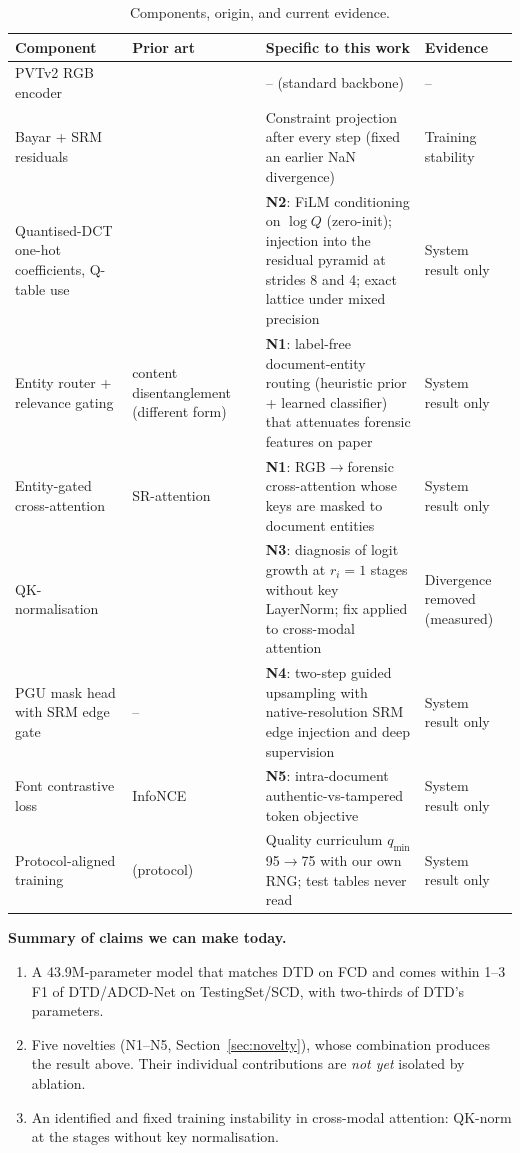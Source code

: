 \documentclass[10pt,a4paper]{article}
\begin{document}
\begin{table}[!htbp]
\centering
\caption{Components, origin, and current evidence.}
\label{tab:novelty}
\small
\begin{tabularx}{\textwidth}{@{}>{\raggedright\arraybackslash}p{3.3cm}>{\raggedright\arraybackslash}p{3.0cm}>{\raggedright\arraybackslash}X>{\raggedright\arraybackslash}p{2.7cm}@{}}
\toprule
Component & Prior art & Specific to this work & Evidence \\
\midrule
PVTv2 RGB encoder & \cite{pvtv2} & -- (standard backbone) & -- \\
Bayar + SRM residuals & \cite{bayar,srm} & Constraint projection after every step (fixed an
  earlier NaN divergence) & Training stability \\
Quantised-DCT one-hot coefficients, Q-table use & \cite{catnet,dtd} & \textbf{N2}: FiLM
  conditioning on $\log Q$ (zero-init); injection into the residual pyramid at strides 8
  and 4; exact lattice under mixed precision & System result only \\
Entity router + relevance gating & content disentanglement~\cite{adcd} (different form) &
  \textbf{N1}: label-free document-entity routing (heuristic prior + learned classifier)
  that attenuates forensic features on paper & System result only \\
Entity-gated cross-attention & SR-attention~\cite{pvtv2} & \textbf{N1}: RGB$\rightarrow$forensic
  cross-attention whose keys are masked to document entities & System result only \\
QK-normalisation & \cite{qknorm} & \textbf{N3}: diagnosis of logit growth at $r_i=1$ stages
  without key LayerNorm; fix applied to cross-modal attention & Divergence removed
  (measured) \\
PGU mask head with SRM edge gate & -- & \textbf{N4}: two-step guided upsampling with
  native-resolution SRM edge injection and deep supervision & System result only \\
Font contrastive loss & InfoNCE~\cite{infonce} & \textbf{N5}: intra-document
  authentic-vs-tampered token objective & System result only \\
Protocol-aligned training & \cite{dtd} (protocol) & Quality curriculum
  $q_{\min}$ 95$\rightarrow$75 with our own RNG; test tables never read & System result only \\
\bottomrule
\end{tabularx}
\end{table}

\noindent\textbf{Summary of claims we can make today.}
\begin{enumerate}
  \item A 43.9M-parameter model that matches DTD on FCD and comes within 1--3 F1 of
        DTD/ADCD-Net on TestingSet/SCD, with two-thirds of DTD's parameters.
  \item Five novelties (N1--N5, Section~\ref{sec:novelty}), whose combination produces the
        result above. Their individual contributions are \emph{not yet} isolated by
        ablation.
  \item An identified and fixed training instability in cross-modal attention: QK-norm at
        the stages without key normalisation.
\end{enumerate}
\end{document}
